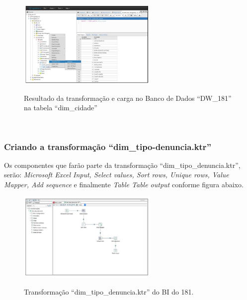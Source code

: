 \begin{figure}[H]
	\vspace*{0,2cm}
    \centering
    \caption{Resultado da transforma\c{c}\~{a}o e carga no Banco de Dados ``DW\_181'' na tabela ``dim\_cidade''}
    \includegraphics[width=0.6\textwidth]{./04-figuras/figura-result-dim-cidade}
    \label{fig:ilustfigresultdimcidade}
\end{figure}
\vspace*{-0,9cm}
{\raggedright {}} \\

\subsubsection{Criando a transforma\c{c}\~{a}o ``dim\_tipo-denuncia.ktr''}

Os componentes que far\~{a}o parte da transforma\c{c}\~{a}o ``dim\_tipo\_denuncia.ktr'', ser\~{a}o: \textit{Microsoft Excel Input, Select values, Sort rows, Unique rows, Value Mapper, Add sequence} e finalmente \textit{Table Table output} conforme figura abaixo. 

\begin{figure}[H]
	\vspace*{0,2cm}
    \centering
    \caption{Transforma\c{c}\~{a}o ``dim\_tipo\_denuncia.ktr'' do BI do 181.}
    \includegraphics[width=0.6\textwidth]{./04-figuras/figura-dim-tipo-denuncia}
    \label{fig:ilustfigrdimtipodenuncia}
\end{figure}
\vspace*{-0,9cm}
{\raggedright {}} \\

